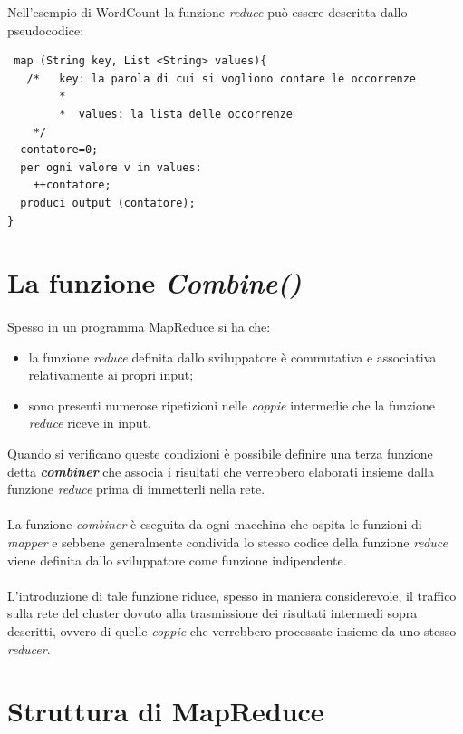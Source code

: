 \documentclass[a4paper,11pt]{report}
\begin{document}
Nell'esempio di WordCount la funzione \emph{reduce} può essere descritta dallo pseudocodice:

\begin{verbatim}
 map (String key, List <String> values){
   /*	key: la parola di cui si vogliono contare le occorrenze
	    *
	    *  values: la lista delle occorrenze
    */
  contatore=0;
  per ogni valore v in values:
    ++contatore;
  produci output (contatore);
}
\end{verbatim}

\section{La funzione \emph{Combine()}}
\paragraph{}
Spesso in un programma MapReduce si ha che:
\begin{itemize}
 \item la funzione \emph{reduce} definita dallo sviluppatore è commutativa e associativa relativamente ai propri input;
\item sono presenti numerose ripetizioni nelle \emph{coppie} intermedie che la funzione \emph{reduce} riceve in input.
\end{itemize}

Quando si verificano queste condizioni è possibile definire una terza funzione detta \emph{\textbf{combiner}} che associa
i risultati che verrebbero elaborati insieme dalla funzione \emph{reduce} prima di immetterli nella rete. 
\paragraph{}
La funzione \emph{combiner} è eseguita da ogni macchina che ospita le funzioni di \emph{mapper} e sebbene generalmente condivida lo stesso
codice della funzione
\emph{reduce} viene definita dallo sviluppatore come funzione indipendente.
 \paragraph{}
L'introduzione di tale funzione riduce, spesso in maniera considerevole, il traffico sulla rete del cluster dovuto alla trasmissione dei
risultati intermedi
sopra descritti, ovvero di quelle \emph{coppie} che verrebbero processate insieme da uno stesso \emph{reducer}. 


\section{Struttura di MapReduce}
\end{document}
